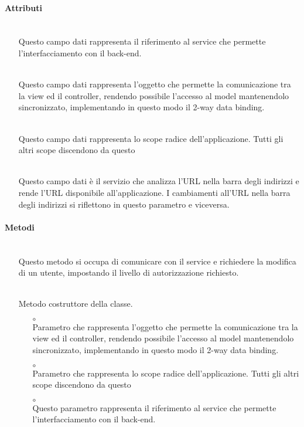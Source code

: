 \paragraph*{Attributi}
\begin{itemize}
\item[]  \\ Questo campo dati rappresenta il riferimento al service che permette l'interfacciamento con il back-end.
\item[]  \\ Questo campo dati rappresenta l'oggetto che permette la comunicazione tra la view ed il controller, rendendo possibile l’accesso al model mantenendolo sincronizzato, implementando in questo modo il 2-way data binding.
\item[]  \\ Questo campo dati rappresenta lo scope radice dell'applicazione. Tutti gli altri scope discendono da questo
\item[]  \\ Questo campo dati è il servizio che analizza l'URL nella barra degli indirizzi e rende l'URL disponibile all'applicazione. I cambiamenti all'URL nella barra degli indirizzi si riflettono in questo parametro e viceversa.
\end{itemize}

\paragraph*{Metodi}
\begin{itemize}
\item[]  \\ Questo metodo si occupa di comunicare con il service e richiedere la modifica di un utente, impostando il livello di autorizzazione richiesto.
\item[]  \\ Metodo costruttore della classe. 
\begin{itemize}\addtolength{\itemsep}{-0.5\baselineskip}
\item[$\circ$]  \\ Parametro che rappresenta l'oggetto che permette la comunicazione tra la view ed il controller, rendendo possibile l’accesso al model mantenendolo sincronizzato, implementando in questo modo il 2-way data binding.
\item[$\circ$]  \\ Parametro che rappresenta lo scope radice dell'applicazione. Tutti gli altri scope discendono da questo
\item[$\circ$]  \\ Questo parametro rappresenta il riferimento al service che permette l'interfacciamento con il back-end.
\end{itemize}
\end{itemize}

